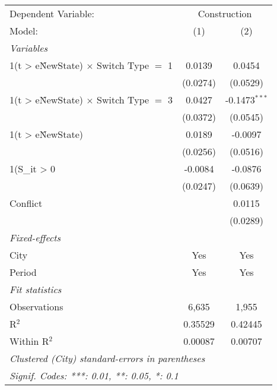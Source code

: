\begingroup
\centering
\begin{tabular}{lcc}
   \tabularnewline \midrule \midrule
   Dependent Variable: & \multicolumn{2}{c}{Construction}\\
   Model:                                          & (1)      & (2)\\  
   \midrule
   \emph{Variables}\\
   1(t > e\^NewState) $\times$ Switch Type $=$ 1   & 0.0139   & 0.0454\\   
                                                   & (0.0274) & (0.0529)\\   
   1(t > e\^NewState) $\times$ Switch Type $=$ 3   & 0.0427   & -0.1473$^{***}$\\   
                                                   & (0.0372) & (0.0545)\\   
   1(t > e\^NewState)                              & 0.0189   & -0.0097\\   
                                                   & (0.0256) & (0.0516)\\   
   1(S\_{it} > 0                                   & -0.0084  & -0.0876\\   
                                                   & (0.0247) & (0.0639)\\   
   Conflict                                        &          & 0.0115\\   
                                                   &          & (0.0289)\\   
   \midrule
   \emph{Fixed-effects}\\
   City                                            & Yes      & Yes\\  
   Period                                          & Yes      & Yes\\  
   \midrule
   \emph{Fit statistics}\\
   Observations                                    & 6,635    & 1,955\\  
   R$^2$                                           & 0.35529  & 0.42445\\  
   Within R$^2$                                    & 0.00087  & 0.00707\\  
   \midrule \midrule
   \multicolumn{3}{l}{\emph{Clustered (City) standard-errors in parentheses}}\\
   \multicolumn{3}{l}{\emph{Signif. Codes: ***: 0.01, **: 0.05, *: 0.1}}\\
\end{tabular}
\par\endgroup
